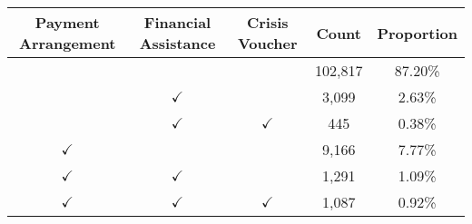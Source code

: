 \begin{tabular}{c|c|c|c|c}
\toprule 
\midrule 
Payment Arrangement & Financial Assistance & Crisis Voucher & Count & Proportion \\
\midrule 
 &  &  & 102,817 & 87.20\% \\
 & $\checkmark$ &  & 3,099 & 2.63\% \\
 & $\checkmark$ & $\checkmark$ & 445 & 0.38\% \\
$\checkmark$ &  &  & 9,166 & 7.77\% \\
$\checkmark$ & $\checkmark$ &  & 1,291 & 1.09\% \\
$\checkmark$ & $\checkmark$ & $\checkmark$ & 1,087 & 0.92\% \\
\midrule 
\bottomrule 
\end{tabular}
